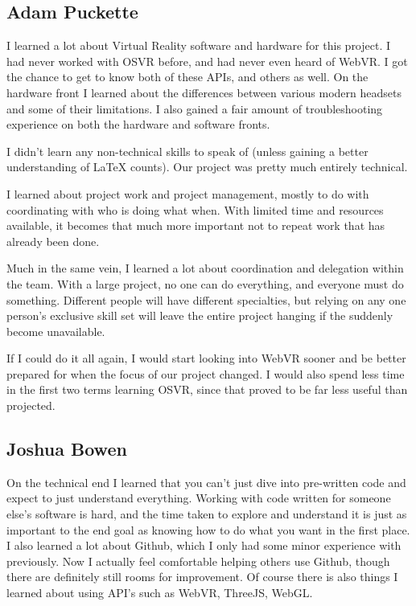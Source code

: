 \documentclass[draftclsnofoot,onecolumn]{IEEEtran}
\begin{document}
\subsection{Adam Puckette}

I learned a lot about Virtual Reality software and hardware for this project. 
I had never worked with OSVR before, and had never even heard of WebVR. 
I got the chance to get to know both of these APIs, and others as well. 
On the hardware front I learned about the differences between various modern headsets and some of their limitations. 
I also gained a fair amount of troubleshooting experience on both the hardware and software fronts.

I didn't learn any non-technical skills to speak of (unless gaining a better understanding of LaTeX counts). Our project was pretty much entirely technical.

I learned about project work and project management, mostly to do with coordinating with who is doing what when. 
With limited time and resources available, it becomes that much more important not to repeat work that has already been done. 

Much in the same vein, I learned a lot about coordination and delegation within the team. 
With a large project, no one can do everything, and everyone must do something. 
Different people will have different specialties, but relying on any one person's exclusive skill set will leave the entire project hanging if the suddenly become unavailable. 

If I could do it all again, I would start looking into WebVR sooner and be better prepared for when the focus of our project changed. 
I would also spend less time in the first two terms learning OSVR, since that proved to be far less useful than projected.  

\subsection{Joshua Bowen}

On the technical end I learned that you can't just dive into pre-written code and expect to just understand everything.
Working with code written for someone else's software is hard, and the time taken to explore and understand it is just as important to the end goal as knowing how to do what you want in the first place.
I also learned a lot about Github, which I only had some minor experience with previously.
Now I actually feel comfortable helping others use Github, though there are definitely still rooms for improvement.
Of course there is also things I learned about using API's such as WebVR, ThreeJS, WebGL.
\end{document}
